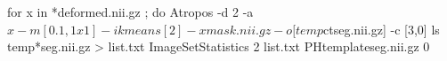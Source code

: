   for x in *deformed.nii.gz ; do 
    Atropos -d 2 -a $x -m [0.1,1x1] -i kmeans[2] -x mask.nii.gz -o [temp${ct}seg.nii.gz] -c [3,0] 
  ls temp*seg.nii.gz > list.txt 
  ImageSetStatistics 2 list.txt PHtemplateseg.nii.gz 0 
